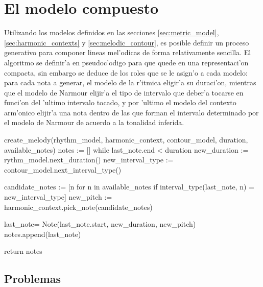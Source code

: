 \section{El modelo compuesto}
Utilizando los modelos definidos en las secciones \ref{sec:metric_model}, \ref{sec:harmonic_contexts} y \ref{sec:melodic_contour}, es posible definir
un proceso generativo para componer lineas mel'odicas de forma relativamente sencilla. El algoritmo se definir'a en pseudoc'odigo para que quede en una representaci'on 
compacta, sin embargo se deduce de los roles que se le asign'o a cada modelo: para cada nota a generar, el modelo de la r'itmica eligir'a su duraci'on, 
mientras que el modelo de Narmour elijir'a el tipo de intervalo que deber'a tocarse en funci'on del 'ultimo intervalo tocado, y por 'ultimo el modelo del contexto arm'onico
elijir'a una nota dentro de las que forman el intervalo determinado por el modelo de Narmour de acuerdo a la tonalidad inferida.

\begin{algoritmo}
create_melody(rhythm_model, harmonic_context, contour_model, duration, available_notes)
    notes := []
    while last_note.end < duration
        new_duration := rythm_model.next_duration()
        new_interval_type := contour_model.next_interval_type()

        candidate_notes := [n for n in available_notes if interval_type(last_note, n) = new_interval_type]
        new_pitch := harmonic_context.pick_note(candidate_notes)

        last_note= Note(last_note.start, new_duration, new_pitch)
        notes.append(last_note) 

    return notes
\end{algoritmo}
\subsection{Problemas}
